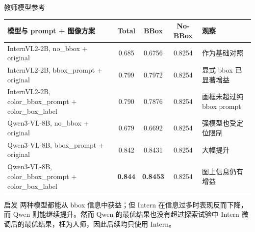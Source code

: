 \documentclass{beamer}
\newcommand{\smalltab}{\scriptsize}
\begin{document}
\begin{frame}[shrink=4]{教师模型参考}
\small
\begin{center}
\smalltab
\begin{tabular}{p{}cccp{}}
\toprule
模型与 prompt + 图像方案 & Total & BBox & No-BBox & 观察 \\
\midrule
InternVL2-2B, no\_bbox + original & 0.685 & 0.6756 & 0.8254 & 作为基础对照 \\
InternVL2-2B, bbox\_prompt + original & 0.799 & 0.7972 & 0.8254 & 显式 bbox 已显著增益 \\
InternVL2-2B, color\_bbox\_prompt + color\_box\_label & 0.790 & 0.7876 & 0.8254 & 画框未超过纯 bbox prompt \\
Qwen3-VL-8B, no\_bbox + original & 0.679 & 0.6692 & 0.8254 & 强模型也受定位限制 \\
Qwen3-VL-8B, bbox\_prompt + original & 0.842 & 0.8431 & 0.8254 & 大幅提升 \\
Qwen3-VL-8B, color\_bbox\_prompt + color\_box\_label & \textbf{0.844} & \textbf{0.8453} & 0.8254 & 图上信息仍有增益 \\
\bottomrule
\end{tabular}
\end{center}
\begin{block}{启发}
两种模型都能从 bbox 信息中获益；但 Intern 在信息过多时表现反而下降，而 Qwen 则能继续提升。然而 Qwen 的最优结果也没有超过探索试验中 Intern 微调后的最优结果，枉为人师，因此后续均只使用 Intern。
\end{block}
\end{frame}
\end{document}
